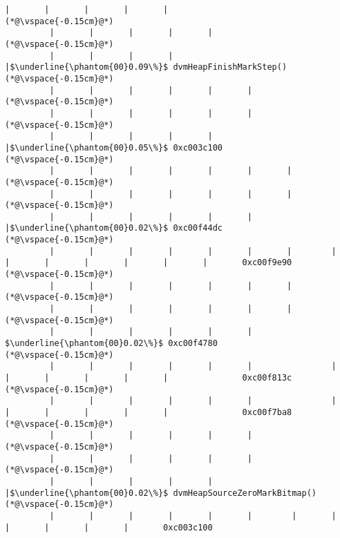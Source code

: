 \begin{lstlisting}[caption=NewDirectByteBuffer, label=profile:C2JNewDirectBuffer-512, numberbychapter=true, frame=lines, float, floatplacement=t]
         |       |       |       |       |
(*@\vspace{-0.15cm}@*)
         |       |       |       |       |
(*@\vspace{-0.15cm}@*)
         |       |       |       |       |$\underline{\phantom{00}0.09\%}$ dvmHeapFinishMarkStep()
(*@\vspace{-0.15cm}@*)
         |       |       |       |       |       |
(*@\vspace{-0.15cm}@*)
         |       |       |       |       |       |
(*@\vspace{-0.15cm}@*)
         |       |       |       |       |       |$\underline{\phantom{00}0.05\%}$ 0xc003c100
(*@\vspace{-0.15cm}@*)
         |       |       |       |       |       |       |
(*@\vspace{-0.15cm}@*)
         |       |       |       |       |       |       |
(*@\vspace{-0.15cm}@*)
         |       |       |       |       |       |       |$\underline{\phantom{00}0.02\%}$ 0xc00f44dc
(*@\vspace{-0.15cm}@*)
         |       |       |       |       |       |       |        |       |       |       |       |       |       |       0xc00f9e90
(*@\vspace{-0.15cm}@*)
         |       |       |       |       |       |       |
(*@\vspace{-0.15cm}@*)
         |       |       |       |       |       |       |
(*@\vspace{-0.15cm}@*)
         |       |       |       |       |       |        $\underline{\phantom{00}0.02\%}$ 0xc00f4780
(*@\vspace{-0.15cm}@*)
         |       |       |       |       |       |                |       |       |       |       |       |               0xc00f813c
(*@\vspace{-0.15cm}@*)
         |       |       |       |       |       |                |       |       |       |       |       |               0xc00f7ba8
(*@\vspace{-0.15cm}@*)
         |       |       |       |       |       |
(*@\vspace{-0.15cm}@*)
         |       |       |       |       |       |
(*@\vspace{-0.15cm}@*)
         |       |       |       |       |       |$\underline{\phantom{00}0.02\%}$ dvmHeapSourceZeroMarkBitmap()
(*@\vspace{-0.15cm}@*)
         |       |       |       |       |       |        |       |       |       |       |       |       0xc003c100

\end{lstlisting}
